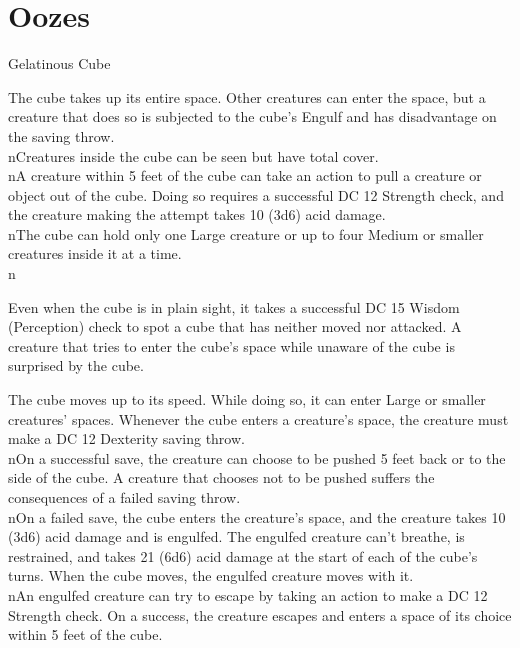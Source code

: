 \clearpage
\section{Oozes}

\begin{DndMonster}[width=\textwidth + 8pt]{Gelatinous Cube}
	\begin{multicols}{2}
	\DndMonsterBasics[armor-class={6}, hit-points={84 (8d10 + 40)}, speed={15 ft.}]
	\DndMonsterDetails[saving-throws={}, skills={}, damage-immunities={}, damage-resistances={}, damage-vulnerabilities={}, condition-immunities={blinded, charmed, deafened, exhaustion, frightened, prone}, senses={blindsight 60 ft. (blind beyond this radius), passive Perception 8}, languages={—}, challenge={2 (450 XP)}]
	 The cube takes up its entire space. Other creatures can enter the space, but a creature that does so is subjected to the cube’s Engulf and has disadvantage on the saving throw.\\nCreatures inside the cube can be seen but have total cover.\\nA creature within 5 feet of the cube can take an action to pull a creature or object out of the cube. Doing so requires a successful DC 12 Strength check, and the creature making the attempt takes 10 (3d6) acid damage.\\nThe cube can hold only one Large creature or up to four Medium or smaller creatures inside it at a time.\\n
	
	 Even when the cube is in plain sight, it takes a successful DC 15 Wisdom (Perception) check to spot a cube that has neither moved nor attacked. A creature that tries to enter the cube’s space while unaware of the cube is surprised by the cube.
	
	\DndMonsterAttack[
		name=Pseudopod,
		distance=melee,
		type=weapon,
		mod=+4,
		reach=5,
		dmg=\DndDice{3d6},
		dmg-type=acid
	]
	The cube moves up to its speed. While doing so, it can enter Large or smaller creatures’ spaces. Whenever the cube enters a creature’s space, the creature must make a DC 12 Dexterity saving throw.\\nOn a successful save, the creature can choose to be pushed 5 feet back or to the side of the cube. A creature that chooses not to be pushed suffers the consequences of a failed saving throw.\\nOn a failed save, the cube enters the creature’s space, and the creature takes 10 (3d6) acid damage and is engulfed. The engulfed creature can’t breathe, is restrained, and takes 21 (6d6) acid damage at the start of each of the cube’s turns. When the cube moves, the engulfed creature moves with it.\\nAn engulfed creature can try to escape by taking an action to make a DC 12 Strength check. On a success, the creature escapes and enters a space of its choice within 5 feet of the cube.
	\end{multicols}
	\end{DndMonster}


